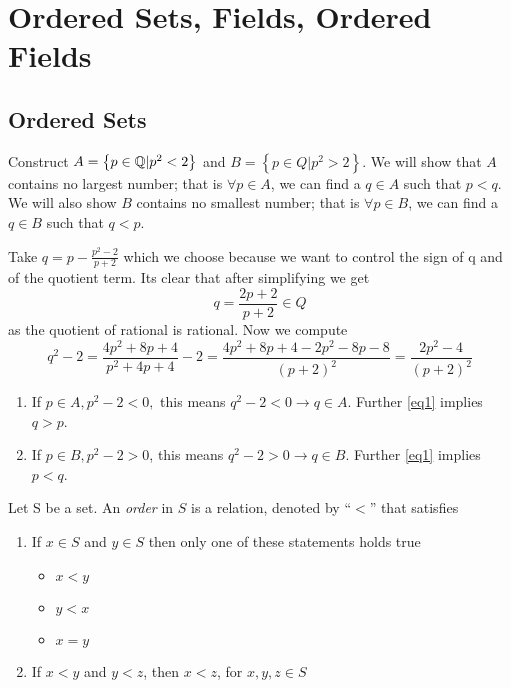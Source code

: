 

\section{Ordered Sets, Fields, Ordered Fields}
\subsection{Ordered Sets}
\begin{example}
	\label{example1}
	Construct \( A = \left\{ p \in \mathbb{Q} | p^2 < 2 \right\} \) and \( B = \left\{ p \in Q | p^2 > 2
	\right\} \). We will show that \( A \) contains no largest number; that is 
	\( \forall p \in A\), we can find a \( q \in A \) such that \( p < q \).
	We will also show \( B \) contains no smallest number;
	that is \( \forall p \in B \), we can find a \( q \in B \) such that \( q < p \).

	Take \( q = p - \frac{p^2-2}{p+2} \) which we choose because we want to control the sign of
	q and of the quotient term. Its clear that after simplifying we get
	\begin{equation}
		q = \frac{2p+2}{p+2} \in Q
		\label{eq1}
	\end{equation}
	as the quotient of rational is rational. Now we compute 
	\begin{equation}
		q^2 - 2 = \frac{4p^2+8p+4}{p^2+4p+4} - 2 = \frac{4p^2 + 8p + 4 - 2p^2 - 8p -8}
		{(p+2)^2} = \frac{2p^2 - 4}{(p+2)^2}
		\label{eq2}
	\end{equation}
	\begin{enumerate}[]
		\item If \( p \in A, p^2 - 2 < 0, \) this means \( q^2-2 < 0 \rightarrow q \in A \).
			Further \ref{eq1} implies \( q > p \). 
		\item If \( p \in B, p^2 - 2 > 0 \), this means \( q^2 - 2 > 0 \rightarrow q \in B \).
			Further \ref{eq1} implies \( p < q \).
	\end{enumerate}
\end{example}

\begin{definition}
	Let S be a set. An {\em order}  in \( S \) is a relation, denoted by ``\( < \)'' that
	satisfies
	\begin{enumerate}[]
		\item If \( x \in S \) and \( y \in S \) then only one of these statements holds true
			\begin{itemize}[]
				\item \( x < y \)
				\item \( y < x \)
				\item \( x = y \)
			\end{itemize}
		\item If \( x < y \) and \( y < z \), then \( x < z \), for \( x,y,z \in S \)
	\end{enumerate}
	\label{order}
\end{definition}

